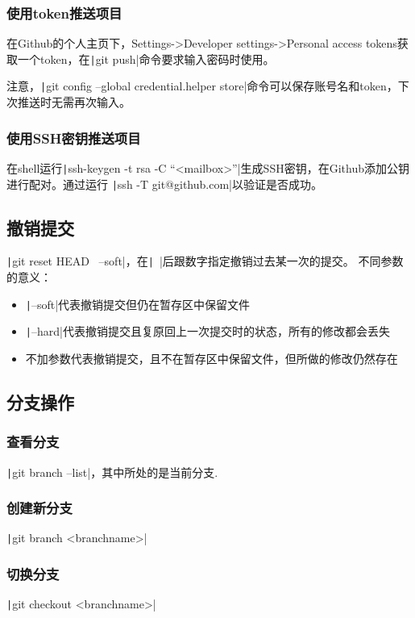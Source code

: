 \documentclass[fontset=ubuntu]{ctexart}
\begin{document}
\subsubsection{使用token推送项目}
在Github的个人主页下，Settings->Developer settings->Personal access tokens获取一个token，在\texttt|git push|命令要求输入密码时使用。

注意，\texttt|git config --global credential.helper store|命令可以保存账号名和token，下次推送时无需再次输入。

\subsubsection{使用SSH密钥推送项目}
在shell运行\texttt|ssh-keygen -t rsa -C “<mailbox>”|生成SSH密钥，在Github添加公钥进行配对。通过运行
\texttt|ssh -T git@github.com|以验证是否成功。

\subsection{撤销提交}
\texttt|git reset HEAD~ --soft|，在\texttt|~|后跟数字指定撤销过去某一次的提交。
不同参数的意义：
\begin{itemize}
    \item \texttt|--soft|代表撤销提交但仍在暂存区中保留文件
    \item \texttt|--hard|代表撤销提交且复原回上一次提交时的状态，所有的修改都会丢失
    \item 不加参数代表撤销提交，且不在暂存区中保留文件，但所做的修改仍然存在
\end{itemize}

\subsection{分支操作}
\subsubsection{查看分支}
\texttt|git branch --list|，其中\*所处的是当前分支.

\subsubsection{创建新分支}
\texttt|git branch <branchname>|

\subsubsection{切换分支}
\texttt|git checkout <branchname>|
\end{document}
